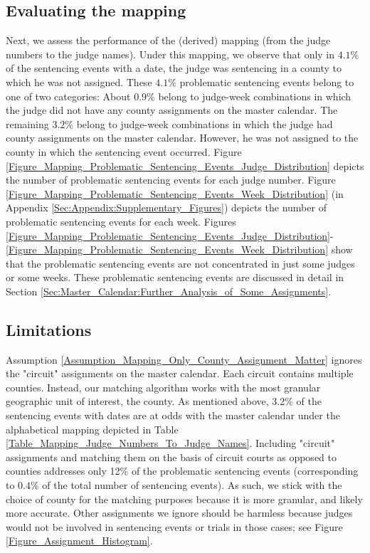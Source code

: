 \documentclass[11pt, oneside]{article}   	%
\theoremstyle{ModifiedStyle}
\begin{document}
  \subsection{Evaluating the mapping}
  	Next, we assess the performance of the (derived) mapping (from the judge numbers to the judge names). Under this mapping, we observe that only in $4.1\%$ of the sentencing events with a date, the judge was sentencing in a county to which he was not assigned. These $4.1\%$ problematic sentencing events belong to one of two categories: About $0.9\%$ belong to judge-week combinations in which the judge did not have any county assignments on the master calendar. The remaining $3.2\%$ belong to judge-week combinations in which the judge had county assignments on the master calendar. However, he was not assigned to the county in which the sentencing event occurred. Figure \ref{Figure_Mapping_Problematic_Sentencing_Events_Judge_Distribution} depicts the number of problematic sentencing events for each judge number. Figure \ref{Figure_Mapping_Problematic_Sentencing_Events_Week_Distribution} (in Appendix \ref{Sec:Appendix:Supplementary_Figures}) depicts the number of problematic sentencing events for each week. Figures \ref{Figure_Mapping_Problematic_Sentencing_Events_Judge_Distribution}-\ref{Figure_Mapping_Problematic_Sentencing_Events_Week_Distribution} show that the problematic sentencing events are not concentrated in just some judges or some weeks. These problematic sentencing events are discussed in detail in Section \ref{Sec:Master_Calendar:Further_Analysis_of_Some_Assignments}.

  \subsection{Limitations}
  	Assumption \ref{Assumption_Mapping_Only_County_Assignment_Matter} ignores the "circuit" assignments on the master calendar. Each circuit contains multiple counties. Instead, our matching algorithm works with the most granular geographic unit of interest, the county. As mentioned above, 3.2\% of the sentencing events with dates are at odds with the master calendar under the alphabetical mapping depicted in Table \ref{Table_Mapping_Judge_Numbers_To_Judge_Names}. Including "circuit" assignments and matching them on the basis of circuit courts as opposed to counties addresses only 12\% of the problematic sentencing events (corresponding to $0.4\%$ of the total number of sentencing events). As such, we stick with the choice of county for the matching purposes because it is more granular, and likely more accurate. Other assignments we ignore should be harmless because judges would not be involved in sentencing events or trials in those cases; see Figure  \ref{Figure_Assignment_Histogram}.
\end{document}
